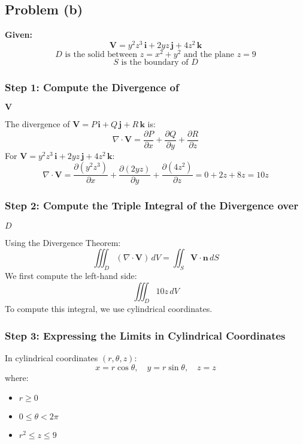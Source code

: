 \documentclass[11pt]{article}
\begin{document}
\newpage

\subsection{Problem (b)}

\textbf{Given:}
\[
\mathbf{V} = y^2 z^3\,\mathbf{i} + 2 y z\,\mathbf{j} + 4 z^2\,\mathbf{k}
\]
\[
D \text{ is the solid between } z = x^2 + y^2 \text{ and the plane } z = 9
\]
\[
S \text{ is the boundary of } D
\]

\subsubsection*{Step 1: Compute the Divergence of } $\mathbf{V}$

The divergence of \( \mathbf{V} = P\,\mathbf{i} + Q\,\mathbf{j} + R\,\mathbf{k} \) is:
\[
\nabla \cdot \mathbf{V} = \frac{\partial P}{\partial x} + \frac{\partial Q}{\partial y} + \frac{\partial R}{\partial z}
\]
For \( \mathbf{V} = y^2 z^3\,\mathbf{i} + 2 y z\,\mathbf{j} + 4 z^2\,\mathbf{k} \):
\[
\nabla \cdot \mathbf{V} = \frac{\partial (y^2 z^3)}{\partial x} + \frac{\partial (2 y z)}{\partial y} + \frac{\partial (4 z^2)}{\partial z} = 0 + 2 z + 8 z = 10 z
\]

\subsubsection*{Step 2: Compute the Triple Integral of the Divergence over } $D$

Using the Divergence Theorem:
\[
\iiint_{D} (\nabla \cdot \mathbf{V}) \, dV = \iint_{S} \mathbf{V} \cdot \mathbf{n} \, dS
\]
We first compute the left-hand side:
\[
\iiint_{D} 10 z \, dV
\]
To compute this integral, we use cylindrical coordinates.

\subsubsection*{Step 3: Expressing the Limits in Cylindrical Coordinates}

In cylindrical coordinates \((r, \theta, z)\):
\[
x = r \cos\theta, \quad y = r \sin\theta, \quad z = z
\]
where:
\begin{itemize}
    \item \( r \geq 0 \)
    \item \( 0 \leq \theta < 2\pi \)
    \item \( r^2 \leq z \leq 9 \)
\end{itemize}
\end{document}
